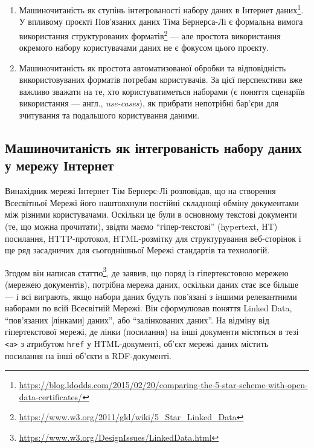 \documentclass[
]{agujournal2019}
\providecommand{\tightlist}{%
  \setlength{\itemsep}{0pt}\setlength{\parskip}{0pt}}\usepackage{longtable,booktabs,array}
\begin{document}
\begin{enumerate}
\def\labelenumi{\arabic{enumi}.}
\tightlist
\item
  Машиночитаність як ступінь інтегрованості набору даних в Інтернет
  даних\footnote{\url{https://blog.ldodds.com/2015/02/20/comparing-the-5-star-scheme-with-open-data-certificates/}}.
  У впливому проєкті Пов'язаних даних Тіма Бернерса-Лі є формальна
  вимога використання структурованих форматів\footnote{\url{https://www.w3.org/2011/gld/wiki/5_Star_Linked_Data}}
  --- але простота використання окремого набору користувачами даних не є
  фокусом цього проєкту.
\item
  Машиночитаність як простота автоматизованої обробки та відповідність
  використовуваних форматів потребам користувачів. За цієї перспекстиви
  вже важливо зважати на те, хто користуватиметься наборами (є поняття
  сценаріїв використання --- англ., \emph{use-cases}), як прибрати
  непотрібні бар'єри для зчитування та подальшого користування даними.
\end{enumerate}

\subsection{Машиночитаність як інтегрованість набору даних у мережу
Інтернет}\label{ux43cux430ux448ux438ux43dux43eux447ux438ux442ux430ux43dux456ux441ux442ux44c-ux44fux43a-ux456ux43dux442ux435ux433ux440ux43eux432ux430ux43dux456ux441ux442ux44c-ux43dux430ux431ux43eux440ux443-ux434ux430ux43dux438ux445-ux443-ux43cux435ux440ux435ux436ux443-ux456ux43dux442ux435ux440ux43dux435ux442}

Винахідник мережі Інтернет Тім Бернерс-Лі розповідав, що на створення
Всесвітньої Мережі його наштовхнули постійні складнощі обміну
документами між різними користувачами. Оскільки це були в основному
текстові документи (те, що можна прочитати), звідти маємо
``гіпер-текстові'' (hypertext, HT) посилання, HTTP-протокол,
HTML-розмітку для структурування веб-сторінок і ще ряд засадничих для
сьогоднішньої Мережі стандартів та технологій.

Згодом він написав статтю\footnote{\url{https://www.w3.org/DesignIssues/LinkedData.html}},
де заявив, що поряд із гіпертекстовою мережею (мережею документів),
потрібна мережа даних, оскільки даних стає все більше --- і всі
виграють, якщо набори даних будуть пов'язані з іншими релевантними
наборами по всій Всесвітній Мережі. Він сформулював поняття Linked Data,
``пов'язаних {[}лінками{]} даних'', або ``залінкованих даних''. На
відміну від гіпертекстової мережі, де лінки (посилання) на інші
документи містяться в тезі \texttt{\textless{}a\textgreater{}} з
атрибутом \texttt{href} у HTML-документі, об'єкт мережі даних містить
посилання на інші об'єкти в RDF-документі.
\end{document}
